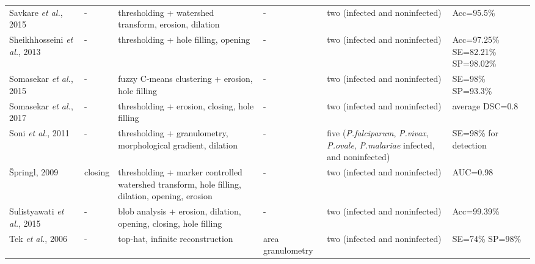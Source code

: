 \begin{longtable}{C{2.1cm} C{2.1cm} C{2.3cm} C{1.5cm} C{2.7cm} C{2.2cm} }
    Savkare \emph{et al.}, 2015  &
    	- &
    	thresholding + watershed transform, erosion, dilation  &
    	- &
    	two (infected and noninfected) &
    	Acc=95.5\% \vspace{0.6cm} \\

    Sheikhhosseini \emph{et al.}, 2013  &
    	- &
    	thresholding + hole filling, opening  &
    	- &
    	two (infected and noninfected) &
    	Acc=97.25\% SE=82.21\% SP=98.02\% \vspace{0.6cm} \\

    Somasekar \emph{et al.}, 2015  &
    	- &
    	fuzzy C-means clustering + erosion, hole filling  &
    	- &
    	two (infected and noninfected) &
    	SE=98\% SP=93.3\% \vspace{0.6cm} \\

    Somasekar \emph{et al.}, 2017  &
    	- &
    	thresholding + erosion, closing, hole filling  &
    	- &
    	two (infected and noninfected) &
    	average DSC=0.8 \vspace{0.6cm} \\

    Soni \emph{et al.}, 2011  &
    	- &
    	thresholding + granulometry, morphological gradient, dilation  &
    	- &
    	five (\emph{P.falciparum}, \emph{P.vivax}, \emph{P.ovale}, \emph{P.malariae} infected, and noninfected) &
    	SE=98\% for detection  \vspace{0.6cm} \\

{\v{S}}pringl, 2009  &
    	closing &
    	thresholding + marker controlled watershed transform, hole filling, dilation, opening, erosion  &
    	- &
    	two (infected and noninfected) &
    	AUC=0.98 \vspace{0.6cm} \\

    Sulistyawati \emph{et al.}, 2015  &
    	- &
    	blob analysis + erosion, dilation, opening, closing, hole filling  &
    	- &
    	two (infected and noninfected) &
    	Acc=99.39\% \vspace{0.6cm} \\

 Tek \emph{et al.}, 2006  &
    	- &
    	top-hat, infinite reconstruction  &
    	area granulometry &
    	two (infected and noninfected) &
    	SE=74\% SP=98\% \vspace{0.6cm} \\


\end{longtable}
